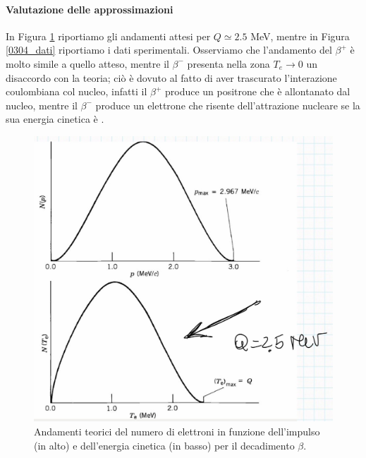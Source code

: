 \paragraph{Valutazione delle approssimazioni} In Figura \ref{0304_teo} riportiamo gli andamenti attesi per $Q\simeq 2.5$ MeV, mentre in Figura \ref{0304_dati} riportiamo i dati sperimentali. Osserviamo che l'andamento del $\beta^+$ è molto simile a quello atteso, mentre il $\beta^-$ presenta nella zona $T_e\to0$ un disaccordo con la teoria; ciò è dovuto al fatto di aver trascurato l'interazione coulombiana col nucleo, infatti il $\beta^+$ produce un positrone che è allontanato dal nucleo, mentre il $\beta^-$ produce un elettrone che risente dell'attrazione nucleare se la sua energia cinetica è .

\begin{figure}[h]
    \centering
    \includegraphics[scale=0.2]{Immagini/0304_andamenti.png}
    \caption{Andamenti teorici del numero di elettroni in funzione dell'impulso (in alto) e dell'energia cinetica (in basso) per il decadimento $\beta$.}
    \label{0304_teo}
\end{figure}
